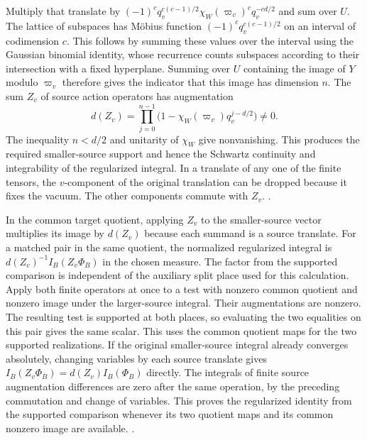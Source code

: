 Multiply that translate by
\((-1)^c q_v^{c(c-1)/2}\chi_W(\varpi_v)^c q_v^{-cd/2}\)
and sum over \(U\). The lattice of subspaces has M\"obius
function \((-1)^c q_v^{c(c-1)/2}\) on an interval of
codimension \(c\). This follows by summing these values over
the interval using the Gaussian binomial identity, whose
recurrence counts subspaces according to their intersection
with a fixed hyperplane. Summing over \(U\) containing the
image of \(Y\) modulo \(\varpi_v\) therefore gives the
indicator that this image has dimension \(n\). The sum
\(Z_v\) of source action operators has augmentation
\[
 d(Z_v)=\prod_{j=0}^{n-1}
          \bigl(1-\chi_W(\varpi_v)q_v^{j-d/2}\bigr)\ne0.
\]
The inequality \(n<d/2\) and unitarity of \(\chi_W\) give
nonvanishing. This produces the required smaller-source
support and hence the Schwartz continuity and integrability
of the regularized integral. In a translate of any one of the
finite tensors, the \(v\)-component of the original
translation can be dropped because it fixes the vacuum.
The other components commute with \(Z_v\).
.

In the common target quotient, applying \(Z_v\) to the
smaller-source vector multiplies its image by \(d(Z_v)\)
because each summand is a source translate. For a matched
pair in the same quotient, the normalized regularized
integral is \(d(Z_v)^{-1} I_B(Z_v\Phi_B)\) in the chosen
measure. The factor from the supported comparison is
independent of the auxiliary split place used for this
calculation. Apply both finite operators at once to a
test with nonzero common quotient and nonzero image under
the larger-source integral. Their augmentations are nonzero.
The resulting test is supported at both places, so evaluating
the two equalities on this pair gives the same scalar. This
uses the common quotient maps for the two supported realizations.
If the original smaller-source integral already converges
absolutely, changing variables by each source translate
gives \(I_B(Z_v\Phi_B)=d(Z_v)I_B(\Phi_B)\) directly.
The integrals of finite source augmentation differences are
zero after the same operation, by the preceding commutation
and change of variables. This proves the regularized identity
from the supported comparison whenever its two quotient maps
and its common nonzero image are available.
.

